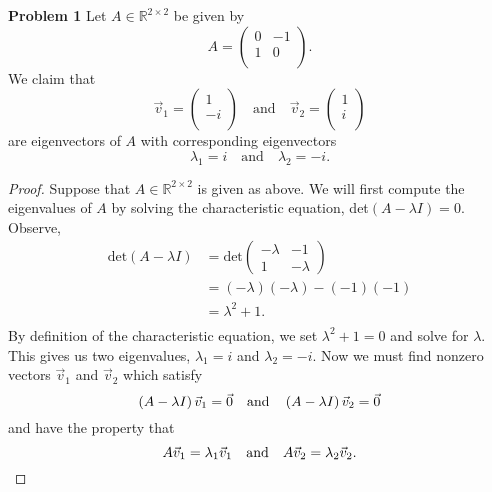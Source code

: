 \documentclass{article}
\begin{document}
\textbf{Problem 1}
Let $A \in \mathbb{R}^{2 \times 2}$ be given by $$A = \begin{pmatrix} 
0 & -1\\
1 & 0\\
\end{pmatrix}.$$ We claim that 
$$\vec{v}_1 = \begin{pmatrix} 
1\\
-i\\
\end{pmatrix} \quad \text{and} \quad \vec{v}_2 = \begin{pmatrix} 
1\\
i\\
\end{pmatrix}$$ are eigenvectors of $A$ with corresponding eigenvectors $$\lambda_1 = i \quad \text{and} \quad \lambda_2 = -i.$$
\begin{proof}
Suppose that $A \in \mathbb{R}^{2\times2}$ is given as above. We will first compute the eigenvalues of $A$ by solving the characteristic equation, det$\left( A - \lambda I \right) = 0.$ Observe,
\begin{align*}
\text{det}\left( A - \lambda I \right) &= \text{det}\begin{pmatrix}-\lambda&-1\\1&-\lambda\end{pmatrix}\\
&= \left(-\lambda\right)\left(-\lambda\right) - \left(-1\right)\left(-1\right)\\
&= \lambda^2 +1.\\
\end{align*}
By definition of the characteristic equation, we set $\lambda^2 + 1 = 0$ and solve for $\lambda$. This gives us two eigenvalues, $\lambda_1 = i$ and $\lambda_2 = -i$. Now we must find nonzero vectors $\vec{v}_1$ and $\vec{v}_2$ which satisfy
\begin{equation}\label{eq1}
\left( A - \lambda I \right)\vec{v}_1 = \vec{0} \quad \text{and} \quad \left( A - \lambda I \right)\vec{v}_2 = \vec{0}\\
\end{equation}
and have the property that
\begin{equation}\label{eq2}
A\vec{v}_1 = \lambda_1 \vec{v}_1 \quad \text{and} \quad A\vec{v}_2 = \lambda_2 \vec{v}_2.\\
\end{equation}


\end{proof}
\end{document}
